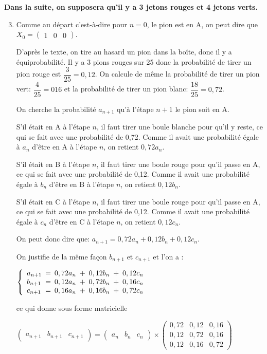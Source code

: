 \documentclass[12pt]{article}
\begin{document}
\textbf{Dans la suite, on supposera qu'il y a 3 jetons rouges et 4 jetons verts.}


\begin{enumerate}
\setcounter{enumi}{2}
\item 

Comme au départ c'est-à-dire pour $n=0$, le pion est en A, on peut dire que $X_0=\begin{pmatrix} 1 & 0 & 0 \end{pmatrix}$.

D'après le texte, on tire au hasard un pion dans la boîte, donc il y a équiprobabilité. Il y a 3 pions rouges sur 25 donc la probabilité de tirer un pion rouge est $\dfrac{3}{25}=0,12$. On calcule de même la probabilité de tirer un pion vert: $\dfrac{4}{25}=016$ et la probabilité de tirer un pion blanc: $\dfrac{18}{25}=0,72$.

On cherche la probabilité $a_{n+1}$ qu'à l'étape $n+1$ le pion soit en A.

S'il était en A à l'étape $n$, il faut tirer une boule blanche pour qu'il y reste, ce qui se fait avec une probabilité de 0,72. Comme il avait une probabilité égale à $a_{n}$ d'être en A à l'étape $n$, on retient $0,72a_{n}$.

S'il était en B à l'étape $n$, il faut tirer une boule rouge pour qu'il passe en A, ce qui se fait avec une probabilité de 0,12. Comme il avait une probabilité égale à $b_{n}$ d'être en B à l'étape $n$, on retient $0,12b_{n}$.

S'il était en C à l'étape $n$, il faut tirer une boule rouge pour qu'il passe en A, ce qui se fait avec une probabilité de 0,12. Comme il avait une probabilité égale à $c_{n}$ d'être en C à l'étape $n$, on retient $0,12c_{n}$.

On peut donc dire que: $a_{n+1}=0,72a_n+0,12b_n+0,12c_n$.

On justifie de la même façon $b_{n+1}$ et $c_{n+1}$ et l'on a :

$\left\lbrace 
\begin{array}{l !{=} c !{+} c !{+} c}
a_{n+1} & 0,72 a_n & 0,12 b_n & 0,12 c_n\\
b_{n+1} & 0,12 a_n & 0,72 b_n & 0,16 c_n\\
c_{n+1} & 0,16 a_n & 0,16 b_n & 0,72 c_n
\end{array}
\right.$

ce qui donne sous forme matricielle

$\begin{pmatrix} a_{n+1} & b_{n+1} & c_{n+1} \end{pmatrix}
=
\begin{pmatrix} a_{n} & b_{n} & c_{n} \end{pmatrix}
\times
\begin{pmatrix} 
0,72 & 0,12 & 0,16 \\
0,12 & 0,72 & 0,16 \\
0,12 & 0,16 & 0,72 
\end{pmatrix}$


\end{enumerate}
\end{document}
